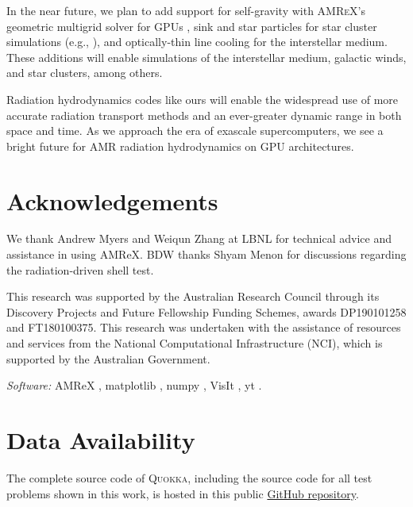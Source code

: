 \documentclass[fleqn,usenatbib]{mnras}
\begin{document}
In the near future, we plan to add support for self-gravity with \textsc{AMReX}'s geometric multigrid solver for GPUs \citep{AMReX_JOSS}, sink and star particles for star cluster simulations (e.g., \citealt{Krumholz04a, Offner09a}), and optically-thin line cooling for the interstellar medium. These additions will enable simulations of the interstellar medium, galactic winds, and star clusters, among others.

Radiation hydrodynamics codes like ours will enable the widespread use of more accurate radiation transport methods and an ever-greater dynamic range in both space and time. As we approach the era of exascale supercomputers, we see a bright future for AMR radiation hydrodynamics on GPU architectures.

\section*{Acknowledgements}
We thank Andrew Myers and Weiqun Zhang at LBNL for technical advice and assistance in using AMReX. BDW thanks Shyam Menon for discussions regarding the radiation-driven shell test.

This research was supported by the Australian Research Council through its Discovery Projects and Future Fellowship Funding Schemes, awards DP190101258 and FT180100375. This research was undertaken with the assistance of resources and services from the National Computational Infrastructure (NCI), which is supported by the Australian Government.

\emph{Software:} AMReX \citep{the_amrex_development_team_2021_5363443},
matplotlib \citep{Hunter:2007},
numpy \citep{harris2020array},
VisIt \citep{HPV:VisIt},
yt \citep{Turk11a}.

\section*{Data Availability}
The complete source code of \textsc{Quokka}, including the source code for all test problems shown in this work, is hosted in this public \faGithub\href{https://github.com/BenWibking/quokka-code}{GitHub repository}.









\bsp	%
\label{lastpage}
\end{document}
